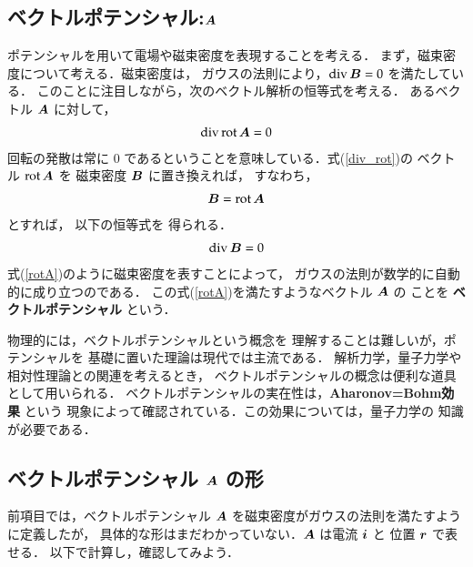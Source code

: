         \subsection{ベクトルポテンシャル:$\boldsymbol{A}$}
            ポテンシャルを用いて電場や磁束密度を表現することを考える．
            まず，磁束密度について考える．磁束密度は，
            ガウスの法則により，$\mathrm{div\,}\boldsymbol{B}=0$ を満たしている．
            このことに注目しながら，次のベクトル解析の恒等式を考える．
            あるベクトル $\boldsymbol{A}$ に対して，
            \begin{align}\label{div_rot}
            \mathrm{div\,rot\,}\bA=0
            \end{align}
            回転の発散は常に 0 であるということを意味している．式(\ref{div_rot})の
            ベクトル $\mathrm{rot\,}\boldsymbol{A}$ を
            磁束密度 $\boldsymbol{B}$ に置き換えれば，
            すなわち，
            \begin{align}\label{rotA}
            \bB=\mathrm{rot\,}\bA
            \end{align}
            とすれば，
            以下の恒等式を
            得られる．
            \begin{align}\label{div_rotA}
            \mathrm{div\,}\bB=0
            \end{align}
            式(\ref{rotA})のように磁束密度を表すことによって，
            ガウスの法則が数学的に自動的に成り立つのである．
            この式(\ref{rotA})を満たすようなベクトル $\boldsymbol{A}$ の
            ことを \textbf{ベクトルポテンシャル} という．

            物理的には，ベクトルポテンシャルという概念を
            理解することは難しいが，ポテンシャルを
            基礎に置いた理論は現代では主流である．
            解析力学，量子力学や相対性理論との関連を考えるとき，
            ベクトルポテンシャルの概念は便利な道具として用いられる．
            ベクトルポテンシャルの実在性は，\textbf{Aharonov=Bohm効果} という
            現象によって確認されている．この効果については，量子力学の
            知識が必要である．

        \subsection{ベクトルポテンシャル $\boldsymbol{A}$ の形}
            前項目では，ベクトルポテンシャル $\boldsymbol{A}$ を磁束密度がガウスの法則を満たすように定義したが，
            具体的な形はまだわかっていない．$\boldsymbol{A}$ は電流 $\boldsymbol{i}$ と 位置 $\boldsymbol{r}$ で表せる．
            以下で計算し，確認してみよう．

